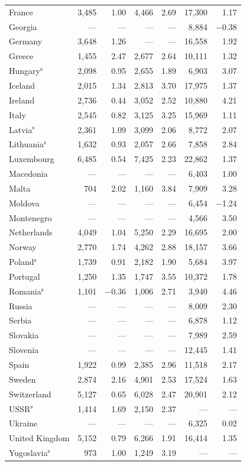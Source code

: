\begin{longtable}{lrrrrrr}
France & 3,485 & 1.00 & 4,466 & 2.69 & 17,300 & 1.17 \\
Georgia & --- & --- & --- & --- & 8,884 & $-$0.38 \\
Germany & 3,648 & 1.26 & --- & --- & 16,558 & 1.92 \\
Greece & 1,455 & 2.47 & 2,677 & 2.64 & 10,111 & 1.32 \\
Hungary$^{\mathrm{s}}$ & 2,098 & 0.95 & 2,655 & 1.89 & 6,903 & 3.07 \\
Iceland & 2,015 & 1.34 & 2,813 & 3.70 & 17,975 & 1.37 \\
Ireland & 2,736 & 0.44 & 3,052 & 2.52 & 10,880 & 4.21 \\
Italy & 2,545 & 0.82 & 3,125 & 3.25 & 15,969 & 1.11 \\
Latvia$^{\mathrm{s}}$ & 2,361 & 1.09 & 3,099 & 2.06 & 8,772 & 2.07 \\
Lithuania$^{\mathrm{s}}$ & 1,632 & 0.93 & 2,057 & 2.66 & 7,858 & 2.84 \\
Luxembourg & 6,485 & 0.54 & 7,425 & 2.23 & 22,862 & 1.37 \\
Macedonia & --- & --- & --- & --- & 6,403 & 1.00 \\
Malta & 704 & 2.02 & 1,160 & 3.84 & 7,909 & 3.28 \\
Moldova & --- & --- & --- & --- & 6,454 & $-$1.24 \\
Montenegro & --- & --- & --- & --- & 4,566 & 3.50 \\
Netherlands & 4,049 & 1.04 & 5,250 & 2.29 & 16,695 & 2.00 \\
Norway & 2,770 & 1.74 & 4,262 & 2.88 & 18,157 & 3.66 \\
Poland$^{\mathrm{s}}$ & 1,739 & 0.91 & 2,182 & 1.90 & 5,684 & 3.97 \\
Portugal & 1,250 & 1.35 & 1,747 & 3.55 & 10,372 & 1.78 \\
Romania$^{\mathrm{s}}$ & 1,101 & $-$0.36 & 1,006 & 2.71 & 3,940 & 4.46 \\
Russia & --- & --- & --- & --- & 8,009 & 2.30 \\
Serbia & --- & --- & --- & --- & 6,878 & 1.12 \\
Slovakia & --- & --- & --- & --- & 7,989 & 2.59 \\
Slovenia & --- & --- & --- & --- & 12,445 & 1.41 \\
Spain & 1,922 & 0.99 & 2,385 & 2.96 & 11,518 & 2.17 \\
Sweden & 2,874 & 2.16 & 4,901 & 2.53 & 17,524 & 1.63 \\
Switzerland & 5,127 & 0.65 & 6,028 & 2.47 & 20,901 & 2.12 \\
USSR$^{\mathrm{s}}$ & 1,414 & 1.69 & 2,150 & 2.37 & --- & --- \\
Ukraine & --- & --- & --- & --- & 6,325 & 0.02 \\
United Kingdom & 5,152 & 0.79 & 6,266 & 1.91 & 16,414 & 1.35 \\
Yugoslavia$^{\mathrm{s}}$ & 973 & 1.00 & 1,249 & 3.19 & --- & --- \\
\end{longtable}
